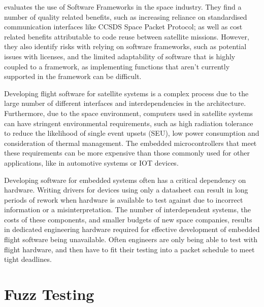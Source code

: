 \documentclass[../report.tex]{subfiles}
\begin{document}
\citet{Farges_2022} evaluates the use of Software Frameworks in the space
industry. They find a number of quality related benefits, such as increasing
reliance on standardised communication interfaces like CCSDS Space Packet
Protocol; as well as cost related benefits attributable to code reuse between
satellite missions. However, they also identify risks with relying on software
frameworks, such as potential issues with licenses, and the limited
adaptability of software that is highly coupled to a framework, as implementing
functions that aren't currently supported in the framework can be difficult.


Developing flight software for satellite systems is a complex process due to
the large number of different interfaces and interdependencies in the
architecture. Furthermore, due to the space environment, computers used in
satellite systems can have stringent environmental requirements, such as high
radiation tolerance to reduce the likelihood of single event upsets (SEU), low
power consumption and consideration of thermal management. The embedded
microcontrollers that meet these requirements can be more expensive than those
commonly used for other applications, like in automotive systems or IOT devices.

Developing software for embedded systems often has a critical dependency on
hardware. Writing drivers for devices using only a datasheet can result in long
periods of rework when hardware is available to test against due to incorrect
information or a misinterpretation. The number of interdependent systems, the
costs of these components, and smaller budgets of new space companies, results
in dedicated engineering hardware required for effective development of
embedded flight software being unavailable. Often engineers are only being able
to test with flight hardware, and then have to fit their testing into a packet
schedule to meet tight deadlines.


\section{Fuzz Testing}

\end{document}
